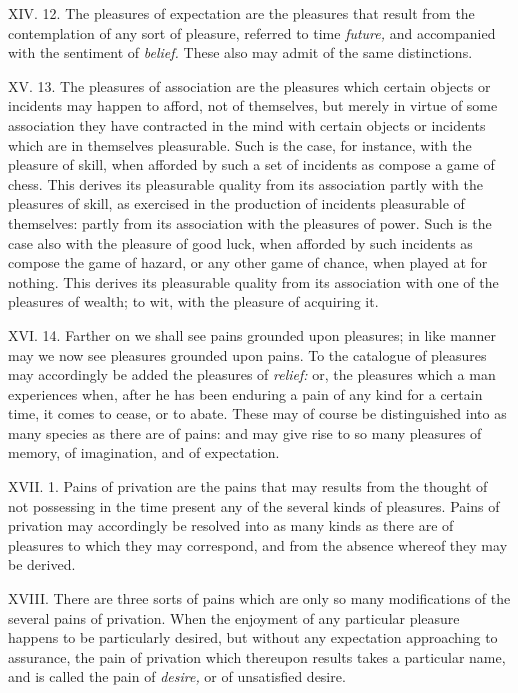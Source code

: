 \documentclass[12pt]{report}
\begin{document}
XIV. 12. The pleasures of expectation are the pleasures that result from
the contemplation of any sort of pleasure, referred to time
\emph{future,} and accompanied with the sentiment of \emph{belief.}
These also may admit of the same distinctions.

XV. 13. The pleasures of association are the pleasures which certain
objects or incidents may happen to afford, not of themselves, but merely
in virtue of some association they have contracted in the mind with
certain objects or incidents which are in themselves pleasurable. Such
is the case, for instance, with the pleasure of skill, when afforded by
such a set of incidents as compose a game of chess. This derives its
pleasurable quality from its association partly with the pleasures of
skill, as exercised in the production of incidents pleasurable of
themselves: partly from its association with the pleasures of power.
Such is the case also with the pleasure of good luck, when afforded by
such incidents as compose the game of hazard, or any other game of
chance, when played at for nothing. This derives its pleasurable quality
from its association with one of the pleasures of wealth; to wit, with
the pleasure of acquiring it.

XVI. 14. Farther on we shall see pains grounded upon pleasures; in like
manner may we now see pleasures grounded upon pains. To the catalogue of
pleasures may accordingly be added the pleasures of \emph{relief:} or,
the pleasures which a man experiences when, after he has been enduring a
pain of any kind for a certain time, it comes to cease, or to abate.
These may of course be distinguished into as many species as there are
of pains: and may give rise to so many pleasures of memory, of
imagination, and of expectation.

XVII. 1. Pains of privation are the pains that may results from the
thought of not possessing in the time present any of the several kinds
of pleasures. Pains of privation may accordingly be resolved into as
many kinds as there are of pleasures to which they may correspond, and
from the absence whereof they may be derived.

XVIII. There are three sorts of pains which are only so many
modifications of the several pains of privation. When the enjoyment of
any particular pleasure happens to be particularly desired, but without
any expectation approaching to assurance, the pain of privation which
thereupon results takes a particular name, and is called the pain of
\emph{desire,} or of unsatisfied desire.
\end{document}
